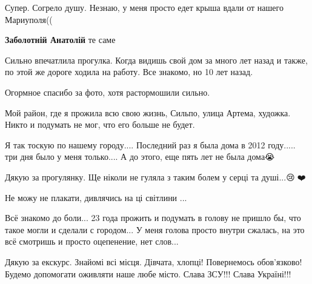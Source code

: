 
 
 
 
 

\qqSecCmt


Супер. Согрело душу. Незнаю, у меня просто едет крыша вдали от нашего Мариуполя((

\begin{itemize} %
\textbf{Заболотній Анатолій} те саме
\end{itemize} %


Сильно впечатлила прогулка. Когда видишь свой дом за много лет назад и также,
по этой же дороге ходила на работу. Все знакомо, но 10 лет назад.

Огормное спасибо за фото, хотя растормошили сильно.


Мой район, где я прожила всю свою жизнь, Сильпо, улица Артема, художка. Никто и
подумать не мог, что его больше не будет.


Я так тоскую по нашему городу.... Последний раз я была дома в 2012 году..... три
дня было у меня только.... А до этого, еще пять лет не была дома😭


Дякую за прогулянку. Ще ніколи не гуляла з таким болем у серці та душі...😢🙏❤️


Не можу не плакати, дивлячись на ці світлини
...


Всё знакомо до боли... 23 года прожить и подумать в голову не пришло бы, что
такое могли и сделали с городом... У меня голова просто внутри сжалась, на это
всё смотришь и просто оцепенение, нет слов...


Дякую за екскурс. Знайомі всі місця. Дівчата, хлопці! Повернемось обов'язково!
Будемо допомогати оживляти наше любе місто. Слава ЗСУ!!! Слава Україні!!!
